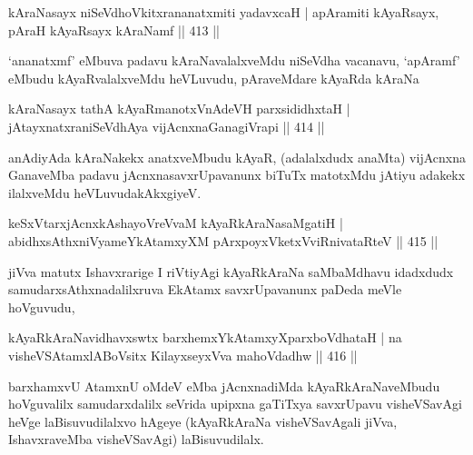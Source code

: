 
\begin{shl}
kAraNasayx niSeVdhoVkitxrananatxmiti yadavxcaH |
apAramiti kAyaRsayx, pAraH kAyaRsayx kAraNamf \hfill || 413 ||
\end{shl}

\begin{artha}
`ananatxmf' eMbuva padavu kAraNavalalxveMdu niSeVdha vacanavu, `apAramf' eMbudu kAyaRvalalxveMdu heVLuvudu, pAraveMdare kAyaRda kAraNa
\end{artha}


\begin{shl}
kAraNasayx tathA kAyaRmanotxV\s nAdeVH parxsididhxtaH |
jAtayxnatxraniSeVdhAya vijAcnxnaGanagiVrapi \hfill || 414 ||
\end{shl}

\begin{artha}
anAdiyAda kAraNakekx anatxveMbudu kAyaR, (adalalxdudx anaMta) vijAcnxna GanaveMba padavu jAcnxnasavxrUpavanunx biTuTx matotxMdu jAtiyu adakekx ilalxveMdu heVLuvudakAkxgiyeV.
\end{artha}

\begin{shl}
keSxVtarxjAcnxkAshayoVreVvaM kAyaRkAraNasaMgatiH |
abidhxsAthxniVyameYkAtamxyXM pArxpoyxVketxVviRnivataRteV \hfill || 415 ||
\end{shl}

\begin{artha}
jiVva matutx Ishavxrarige I riVtiyAgi kAyaRkAraNa saMbaMdhavu idadxdudx samudarxsAthxnadalilxruva EkAtamx savxrUpavanunx paDeda meVle hoVguvudu,
\end{artha}

\begin{shl}
kAyaRkAraNavidhavxswtx barxhemxYkAtamxyXparxboVdhataH |
na visheVSAtamxlABoV\s sitx KilayxseyxVva mahoVdadhw \hfill || 416 ||
\end{shl}

\begin{artha}
barxhamxvU AtamxnU oMdeV eMba jAcnxnadiMda kAyaRkAraNaveMbudu hoVguvalilx samudarxdalilx seVrida upipxna gaTiTxya savxrUpavu visheVSavAgi heVge laBisuvudilalxvo hAgeye (kAyaRkAraNa visheVSavAgali jiVva, IshavxraveMba visheVSavAgi) laBisuvudilalx.
\end{artha}


